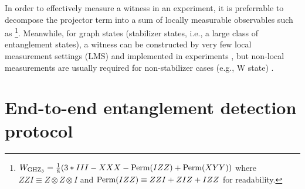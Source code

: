 \documentclass[
aps,
pra,
twocolumn,
floatfix,
]{revtex4-2}
\theoremstyle{plain}
\theoremstyle{definition}
\newcommand{\ew}{W}
\newcommand{\ghz}{\text{GHZ}}
\newcommand{\perm}{\textup{Perm}}
\newcommand{\px}{X}
\newcommand{\pz}{Z}
\begin{document}
In order to effectively measure a witness in an experiment, it is preferrable to decompose the projector term into a sum of locally measurable observables such as 
\footnote{
	$\ew_{\ghz_3} = \frac{1}{8} \qty( 3*III - \px\px\px - \perm(I\pz \pz ) + \perm(XYY))$
	where $\pz \pz I\equiv \pz \otimes\pz \otimes I$ and $\perm(I\pz \pz )\equiv \pz \pz I + \pz I\pz + I\pz \pz$ for readability. 
}.
Meanwhile, for graph states (stabilizer states, i.e., a large class of entanglement states),
a witness can be constructed by very few local measurement settings (LMS) \cite{tothDetectingGenuineMultipartite2005} \cite{tothEntanglementDetectionStabilizer2005} \cite{zhouDetectingMultipartiteEntanglement2019}
and implemented in experiments
\cite{luEntanglementStructureEntanglement2018}
\cite{zhouSchemeCreateVerify2022},
but non-local measurements are usually required for non-stabilizer cases (e.g., W state) \cite{zhangEfficientEntanglementGeneration2021} \cite{zhuMachineLearningDerivedEntanglement2021}.

\section{End-to-end entanglement detection protocol}\label{sec:protocol}
\end{document}
